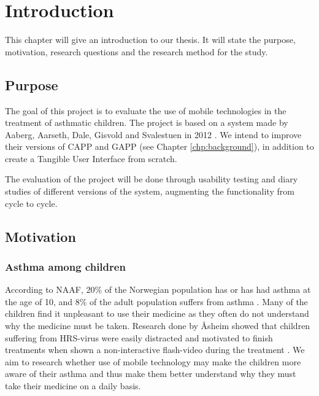 \chapter{Introduction}
\label{chp:introduction}

This chapter will give an introduction to our thesis. It will state the purpose, motivation, research questions and the research method for the study. 

\section{Purpose}
\label{sec:purpose}
The goal of this project is to evaluate the use of mobile technologies in the treatment of asthmatic children. The project is based on a system made by Aaberg, Aarseth, Dale, Gisvold and Svalestuen in 2012 \cite{CustomerDriven}. We intend to improve their versions of CAPP and GAPP (see Chapter \ref{chp:background}), in addition to create a Tangible User Interface from scratch. 

The evaluation of the project will be done through usability testing and diary studies of different versions of the system, augmenting the functionality from cycle to cycle. 



\section{Motivation}
\label{sec:motivation}

\subsection{Asthma among children}
According to NAAF, 20\% of the Norwegian population has or has had asthma at the age of 10, and 8\% of the adult population suffers from asthma \cite{NAAF}. Many of the children find it unpleasant to use their medicine as they often do not understand why the medicine must be taken. Research done by \r{A}sheim showed that children suffering from HRS-virus were easily distracted and motivated to finish treatments when shown a non-interactive flash-video during the treatment \cite{Asheim610877}. We aim to research whether use of mobile technology may make the children more aware of their asthma and thus make them better understand why they must take their medicine on a daily basis. 


